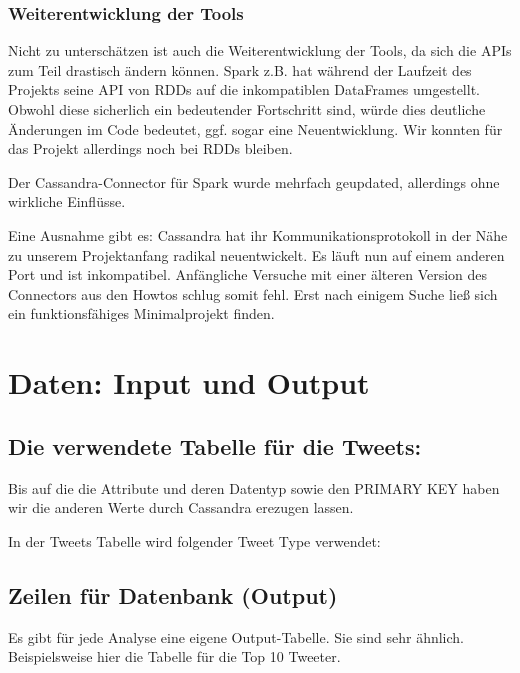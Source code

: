 \subsubsection{Weiterentwicklung der Tools}
Nicht zu unterschätzen ist auch die Weiterentwicklung der Tools, da sich
die APIs zum Teil drastisch ändern können. Spark z.B. hat während der
Laufzeit des Projekts seine API von RDDs auf die inkompatiblen
DataFrames umgestellt. Obwohl diese sicherlich ein bedeutender
Fortschritt sind, würde dies deutliche Änderungen im Code bedeutet,
ggf. sogar eine Neuentwicklung. Wir konnten für das Projekt allerdings
noch bei RDDs bleiben.

Der Cassandra-Connector für Spark wurde mehrfach geupdated, allerdings
ohne wirkliche Einflüsse.

Eine Ausnahme gibt es: Cassandra hat ihr Kommunikationsprotokoll in der
Nähe zu unserem Projektanfang radikal neuentwickelt. Es läuft nun auf
einem anderen Port und ist inkompatibel. Anfängliche Versuche mit einer
älteren Version des Connectors aus den Howtos schlug somit fehl. Erst
nach einigem Suche ließ sich ein funktionsfähiges Minimalprojekt
finden.

\section{Daten: Input
und Output}
\subsection{Die verwendete Tabelle für die
Tweets:}


\bigskip


Bis auf die die Attribute und deren Datentyp sowie den PRIMARY KEY haben
wir die anderen Werte durch Cassandra erezugen lassen.

\bigskip

In der Tweets Tabelle wird folgender Tweet Type verwendet:

\bigskip


\subsection{Zeilen für Datenbank (Output)}
Es gibt für jede Analyse eine eigene Output-Tabelle. Sie sind sehr
ähnlich. Beispielsweise hier die Tabelle für die Top 10 Tweeter.




